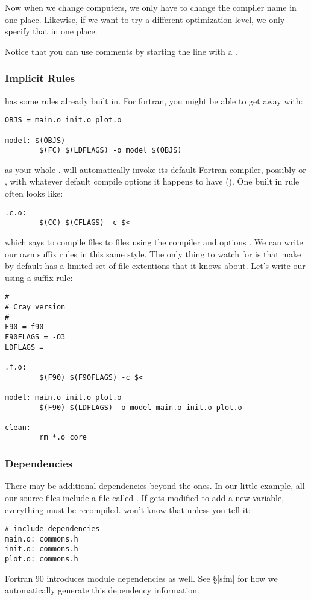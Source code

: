 Now when we change computers, we only have to change the compiler name
in one place. Likewise, if we want to try a different optimization level,
we only specify that in one place.

Notice that you can use comments by starting the line with a \code{\#}.

\subsubsection{Implicit Rules}

 has some rules already built in. For fortran, you might be able
to get away with:
\begin{verbatim}
OBJS = main.o init.o plot.o

model: $(OBJS)
        $(FC) $(LDFLAGS) -o model $(OBJS)
\end{verbatim}
as your whole .  will automatically invoke its
default Fortran compiler, possibly  or , with whatever
default compile options it happens to have (). One built
in rule often looks like:
\begin{verbatim}
.c.o:
        $(CC) $(CFLAGS) -c $<
\end{verbatim}
which says to compile  files to  files using the
compiler  and options . We can write our own suffix
rules in this same style.  The only thing to watch for is that make by
default has a limited set of file extentions that it knows about. Let's
write our  using a suffix rule:
\begin{verbatim}
#
# Cray version
#
F90 = f90
F90FLAGS = -O3
LDFLAGS =

.f.o:
        $(F90) $(F90FLAGS) -c $<

model: main.o init.o plot.o
        $(F90) $(LDFLAGS) -o model main.o init.o plot.o

clean:
        rm *.o core
\end{verbatim}

\subsubsection{Dependencies}

There may be additional dependencies beyond the  ones.
In our little example, all our source files include a file called
. If  gets modified to add a new variable,
everything must be recompiled.  won't know that unless you
tell it:
\begin{verbatim}
# include dependencies
main.o: commons.h
init.o: commons.h
plot.o: commons.h
\end{verbatim}
Fortran 90 introduces module dependencies as well. See \S\ref{sfm}
for how we automatically generate this dependency information.

